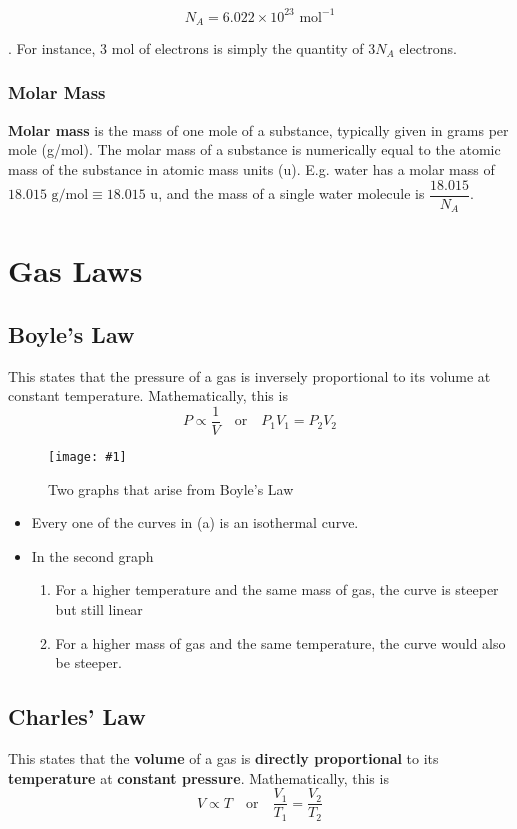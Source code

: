 \documentclass[a4paper,12pt]{article}
\let\oldsection\section
\renewcommand\section{\clearpage\oldsection}
\newcommand{\eqor}{\quad \text{or} \quad}
\newcommand{\img}[4]{\begin{center}
  \begin{figure}[H]
    \centering
    \texttt{[image: \#1]}
    \caption{#3}
    \label{fig:#4}
  \end{figure}
\end{center}}
\begin{document}
$$N_A = 6.022 \times 10^{23} \text{ mol}^{-1}$$

. For instance, 3 mol of electrons is simply the quantity of $3N_A$ electrons.


\subsubsection{Molar Mass}

\textbf{Molar mass} is the mass of one mole of a substance, typically given in grams per mole (g/mol). The molar mass of a substance is numerically equal to the atomic mass of the substance in atomic mass units (u). E.g. water has a molar mass of $18.015 \text{ g/mol} \equiv 18.015 \text{ u}$, and the mass of a single water molecule is $\dfrac{18.015}{N_A}$.

\section{Gas Laws}

\subsection{Boyle's Law}

This states that the pressure of a gas is inversely proportional to its volume at constant temperature. Mathematically, this is
$$P \propto \frac{1}{V} \eqor P_1V_1 = P_2V_2$$

\img{boyle.png}{0.9}{Two graphs that arise from Boyle's Law}{boyle}
\begin{itemize}
  \item Every one of the curves in (a) is an isothermal curve.
  \item In the second graph
        \begin{enumerate}
          \item For a higher temperature and the same mass of gas, the curve is steeper but still linear
          \item For a higher mass of gas and the same temperature, the curve would also be steeper.
        \end{enumerate}
\end{itemize}

\subsection{Charles' Law}

This states that the \textbf{volume} of a gas is \textbf{directly proportional} to its \textbf{temperature} at \textbf{constant pressure}. Mathematically, this is
$$V\propto T \eqor \frac{V_1}{T_1} = \frac{V_2}{T_2}$$
\end{document}

